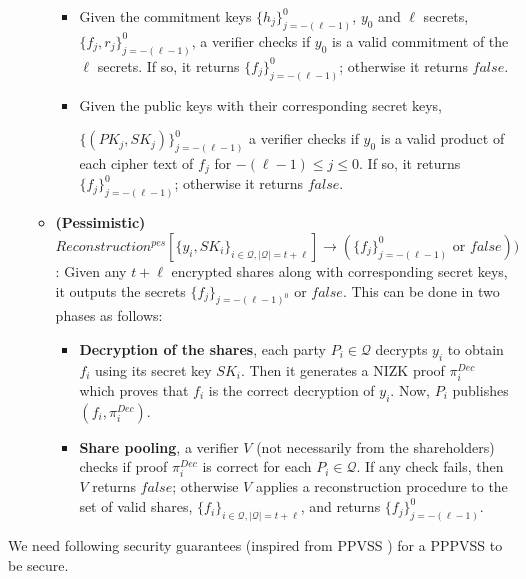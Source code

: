 \begin{definition}
\begin{itemize}
\begin{itemize}
              \begin{itemize}
                \item Given the commitment keys $\{h_j\}_{j=-(\ell-1)}^0$, $y_0$ and $\ell$ secrets, $\{f_j,r_j\}_{j=-(\ell-1)}^0$, 
                 a verifier checks if $y_0$ is a valid commitment of the $\ell$ secrets. If so, it returns 
                 $\{f_j\}_{j=-(\ell-1)}^0$; otherwise it returns $false$.
                \item Given the public keys with their corresponding secret keys,\par $\{(PK_j,SK_j)\}_{j=-(\ell-1)}^0$ 
                 a verifier checks if $y_0$ is a valid product of each cipher text of $f_j$ for $-(\ell-1)\leq j\leq 0$. 
                 If so, it returns $\{f_j\}_{j=-(\ell-1)}^0$; otherwise it returns $false$.
              \end{itemize}
            \item \textbf{(Pessimistic)} $Reconstruction^{pes}[\{y_i,SK_i\}_{i\in\mathcal{Q},|\mathcal{Q}|=t+\ell}]\rightarrow(\{f_j\}_{j=-(\ell-1)}^0\text{ or }false))$: 
              Given any $t+\ell$ encrypted shares along with corresponding secret keys, it outputs the secrets 
              $\{f_j\}_{j=-(\ell-1)^0}$ or $false$. This can be done in two phases as follows: 
                \begin{itemize}
                  \item \textbf{Decryption of the shares}, each party $P_i\in\mathcal{Q}$ decrypts $y_i$ to obtain 
                    $f_i$ using its secret key $SK_i$. Then it generates a NIZK proof $\pi_i^{Dec}$ which proves that 
                    $f_i$ is the correct decryption of $y_i$. Now, $P_i$ publishes $(f_i,\pi_i^{Dec})$.
                  \item \textbf{Share pooling}, a verifier $V$ (not necessarily from the shareholders) checks if proof 
                   $\pi_i^{Dec}$ is correct for each $P_i\in\mathcal{Q}$. If any check fails, then $V$ returns $false$; 
                   otherwise $V$ applies a reconstruction procedure to the set of valid shares, $\{f_i\}_{i\in\mathcal{Q},|\mathcal{Q}|=t+\ell}$, 
                   and returns $\{f_j\}_{j=-(\ell-1)}^0$.
                \end{itemize}
          \end{itemize}
    \end{itemize}
\end{definition}

We need following security guarantees (inspired from PPVSS \cite{cryptoeprint:2025/576}) for a PPPVSS to be 
secure.

